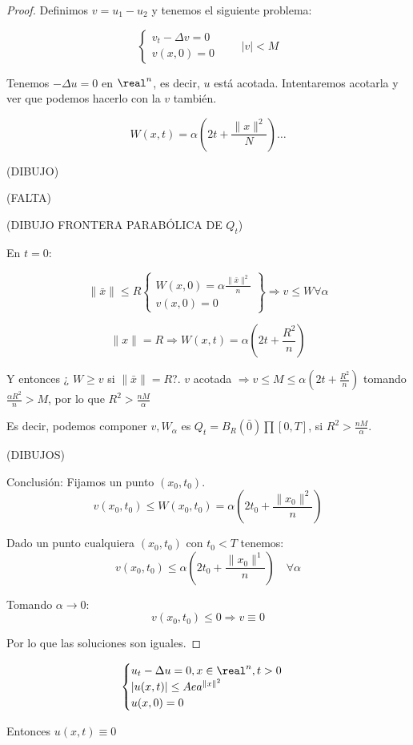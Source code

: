  			\begin{proof}
 				Definimos $v = u_1 -u_2$ y tenemos el siguiente problema:

 				\[\begin{cases}
 					v_t - \Delta v = 0\\
 					v(x,0) = 0
 				\end{cases}  \quad\quad |v| < M\]

 				Tenemos $-\Delta u = 0$ en $\real^n$, es decir, $u$ está acotada. Intentaremos acotarla y ver que podemos hacerlo con la $v$ también.

 				\[ W(x,t) = \alpha (2t + \frac{\| x\|^2}{N}) …\]

 				(DIBUJO)

 				(FALTA)

 				(DIBUJO FRONTERA PARABÓLICA DE $Q_t$)

 				En $t=0$:

 				\[ \|\bar{x}\| \leq R \left. \begin{cases}
 					W(x,0) = \alpha \frac{\|\bar{x}\|^2}{n}\\
 					v(x,0) = 0
 				\end{cases}\right\} \Rightarrow v \leq W \forall \alpha \]

 				\[ \|x\| = R \Rightarrow W(x,t) = \alpha(2t+\frac{R^2}{n}) \]

 				Y entonces ¿ $W \geq v$ si $\|\bar{x}\| = R$?. $v$ acotada $\Rightarrow v \leq M \leq \alpha (2t + \frac{R^2}{n})$ tomando $\frac{\alpha R^2}{n} > M$, por lo que $R^2 > \frac{nM}{\alpha}$

 				Es decir, podemos componer $v, W_\alpha$ es $Q_t = B_R(\bar{0}) \prod [0,T]$, si $R^2 > \frac{nM}{\alpha}$.

 				(DIBUJOS)

 				Conclusión: Fijamos un punto $(x_0,t_0)$.
 					\[v(x_0,t_0) \leq W(x_0,t_0) = \alpha (2t_0+ \frac{\|x_0\|^2}{n})\]

 				Dado un punto cualquiera $(x_0,t_0)$ con $t_0 < T$ tenemos:
 				\[ v(x_0,t_0) \leq \alpha (2 t_0 + \frac{\|x_0\|^1}{n}) \quad \forall \alpha\]

 				Tomando $\alpha \rightarrow 0$:
 				\[v(x_0,t_0) \leq 0 \Rightarrow v \equiv 0\]

 				Por lo que las soluciones son iguales.

 			\end{proof}

 			\begin{theorem}
 				\[\begin{cases}
 					u_t - \Delta u = 0, x \in \real^n, t>0 \\
 					|u(x,t)| \leq A ea^{\|x\|^2} \\
 					u(x,0) = 0
 				\end{cases}\]

 				Entonces $u(x,t) \equiv 0$

 			\end{theorem}

